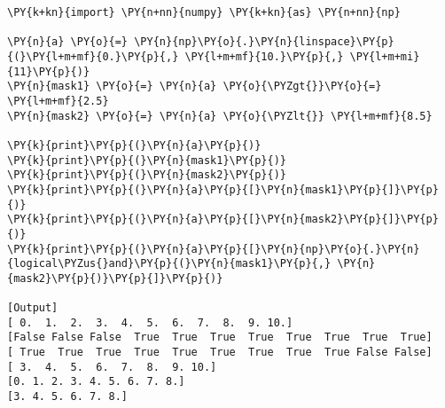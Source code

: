 \begin{Verbatim}[label=\makebox{\url{https://github.com/lucabaldini/cmepda/tree/master/slides/latex/snippets/numpy\_masks.py}},commandchars=\\\{\}]
\PY{k+kn}{import} \PY{n+nn}{numpy} \PY{k+kn}{as} \PY{n+nn}{np}

\PY{n}{a} \PY{o}{=} \PY{n}{np}\PY{o}{.}\PY{n}{linspace}\PY{p}{(}\PY{l+m+mf}{0.}\PY{p}{,} \PY{l+m+mf}{10.}\PY{p}{,} \PY{l+m+mi}{11}\PY{p}{)}
\PY{n}{mask1} \PY{o}{=} \PY{n}{a} \PY{o}{\PYZgt{}}\PY{o}{=} \PY{l+m+mf}{2.5}
\PY{n}{mask2} \PY{o}{=} \PY{n}{a} \PY{o}{\PYZlt{}} \PY{l+m+mf}{8.5}

\PY{k}{print}\PY{p}{(}\PY{n}{a}\PY{p}{)}
\PY{k}{print}\PY{p}{(}\PY{n}{mask1}\PY{p}{)}
\PY{k}{print}\PY{p}{(}\PY{n}{mask2}\PY{p}{)}
\PY{k}{print}\PY{p}{(}\PY{n}{a}\PY{p}{[}\PY{n}{mask1}\PY{p}{]}\PY{p}{)}
\PY{k}{print}\PY{p}{(}\PY{n}{a}\PY{p}{[}\PY{n}{mask2}\PY{p}{]}\PY{p}{)}
\PY{k}{print}\PY{p}{(}\PY{n}{a}\PY{p}{[}\PY{n}{np}\PY{o}{.}\PY{n}{logical\PYZus{}and}\PY{p}{(}\PY{n}{mask1}\PY{p}{,} \PY{n}{mask2}\PY{p}{)}\PY{p}{]}\PY{p}{)}

[Output]
[ 0.  1.  2.  3.  4.  5.  6.  7.  8.  9. 10.]
[False False False  True  True  True  True  True  True  True  True]
[ True  True  True  True  True  True  True  True  True False False]
[ 3.  4.  5.  6.  7.  8.  9. 10.]
[0. 1. 2. 3. 4. 5. 6. 7. 8.]
[3. 4. 5. 6. 7. 8.]
\end{Verbatim}